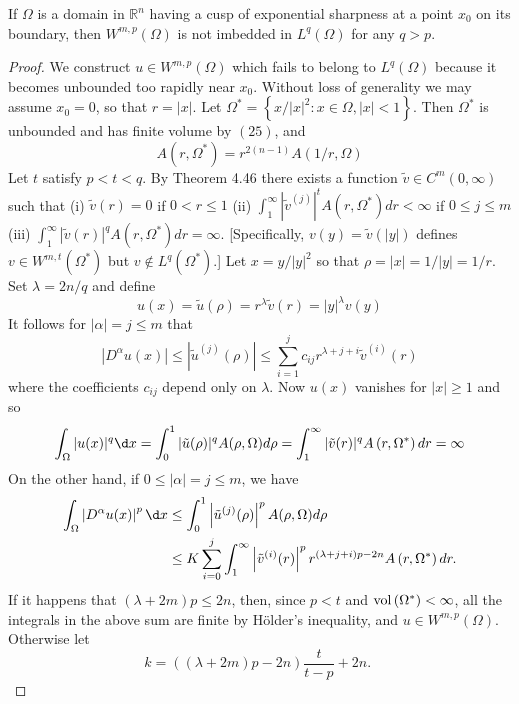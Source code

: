 \begin{theorem}
  If $\Omega$ is a domain in $\mathbb{R}^n$ having a cusp of exponential sharpness at a point $x_0$
  on its boundary, then $W^{m,p}(\Omega)$ is not imbedded in $L^q(\Omega)$ for any $q>p$.
\end{theorem}

\begin{proof}
  We construct $u \in W^{m,p}(\Omega)$ which fails to belong to $L^q(\Omega)$ because
  it becomes unbounded too rapidly near $x_0$. Without loss of generality we may assume $x_0=0$, 
  so that $r=|x|$. Let $\Omega^*=\left\{x /|x|^2: x \in \Omega,|x|<1\right\}$.
  Then $\Omega^*$ is unbounded and has finite volume by $(25)$, and
  \[
  A\left(r, \Omega^*\right)=r^{2(n-1)} A(1 / r, \Omega)
  \]
  Let $t$ satisfy $p<t<q$. By Theorem 4.46 there exists a
  function $\tilde{v} \in C^m(0, \infty)$ such that
  (i) $\tilde{v}(r)=0$ if $0<r \leq 1$
  (ii) $\int_1^{\infty}\left|\tilde{v}^{(j)}\right|^t A\left(r, \Omega^*\right) d r<\infty$ if $0 \leq j \leq m$
  (iii) $\int_1^{\infty}|\tilde{v}(r)|^q A\left(r, \Omega^*\right) d r=\infty$.
  [Specifically, $v(y)=\tilde{v}(|y|)$ defines $v \in W^{m, t}\left(\Omega^*\right)$ but $v \notin L^q\left(\Omega^*\right)$.] Let $x=y /|y|^2$ so that $\rho=|x|=1 /|y|=1 / r$. Set $\lambda=2 n / q$ and define
  \[
  u(x)=\tilde{u}(\rho)=r^\lambda \tilde{v}(r)=|y|^\lambda v(y)
  \]
  It follows for $|\alpha|=j \leq m$ that
  \[
  \left|D^\alpha u(x)\right| \leq\left|\tilde{u}^{(j)}(\rho)\right| \leq \sum_{i=1}^j c_{i j} r^{\lambda+j+i} \tilde{v}^{(i)}(r)
  \]
  where the coefficients $c_{i j}$ depend only on $\lambda$. Now $u(x)$ vanishes for $|x| \geq 1$ and so
  \[
  \int_{\Omega}|u(x)|^q \d x=\int_0^1|\tilde{u}(\rho)|^q A(\rho, \Omega) d \rho=\int_1^{\infty}|\tilde{v}(r)|^q A\left(r, \Omega^*\right) d r=\infty
  \]
  On the other hand, if $0 \leq|\alpha|=j \leq m$, we have
  \[
  \begin{aligned}
  \int_{\Omega}\left|D^\alpha u(x)\right|^p \d x & \leq \int_0^1\left|\tilde{u}^{(j)}(\rho)\right|^p A(\rho, \Omega) d \rho \\
  & \leq K \sum_{i=0}^j \int_1^{\infty}\left|\tilde{v}^{(i)}(r)\right|^p r^{(\lambda+j+i) p-2 n} A\left(r, \Omega^*\right) d r .
  \end{aligned}
  \]
  If it happens that $(\lambda+2 m) p \leq 2 n$, then, since $p<t$ and $\operatorname{vol}\left(\Omega^*\right)<\infty$, all the integrals in the above sum are finite by Hölder's inequality, and $u \in W^{m,p}(\Omega)$. Otherwise let
  \[
  k=((\lambda+2 m) p-2 n) \frac{t}{t-p}+2 n \text {. }
\]
\end{proof}
